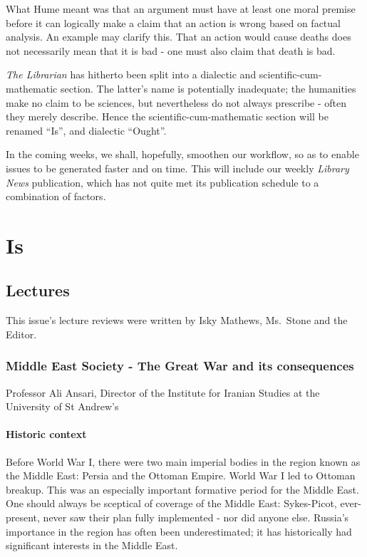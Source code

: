 What Hume meant was that an argument must have at least one moral
premise before it can logically make a claim that an action is wrong
based on factual analysis. An example may clarify this. That an action
would cause deaths does not necessarily mean that it is bad - one must
also claim that death is bad.

\emph{The Librarian} has hitherto been split into a dialectic and
scientific-cum-mathematic section. The latter's name is potentially
inadequate; the humanities make no claim to be sciences, but
nevertheless do not always prescribe - often they merely describe. Hence
the scientific-cum-mathematic section will be renamed ``Is'', and
dialectic ``Ought''.

In the coming weeks, we shall, hopefully, smoothen our workflow, so as
to enable issues to be generated faster and on time. This will include
our weekly \emph{Library News} publication, which has not quite met its
publication schedule to a combination of factors.

\chapter{Is}\label{review}

\section{Lectures}\label{lectures}

This issue's lecture reviews were written by Isky Mathews, Ms.~Stone and
the Editor.

\subsection{Middle East Society - The Great War and its consequences}

Professor Ali Ansari, Director of the Institute for Iranian Studies at
the University of St Andrew's

\subsubsection{Historic context}\label{historic-context}

Before World War I, there were two main imperial bodies in the region
known as the Middle East: Persia and the Ottoman Empire. World War I led
to Ottoman breakup. This was an especially important formative period
for the Middle East. One should always be sceptical of coverage of the
Middle East: Sykes-Picot, ever-present, never saw their plan fully
implemented - nor did anyone else. Russia's importance in the region has
often been underestimated; it has historically had significant interests
in the Middle East.

